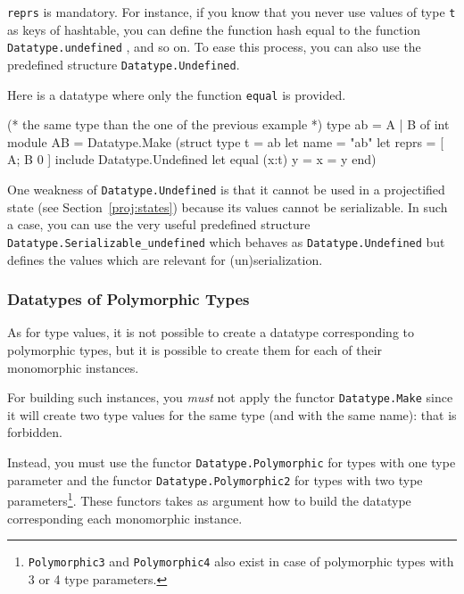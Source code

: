 \texttt{reprs} is mandatory. For instance, if you know that you never
use values of type \texttt{t} as keys of hashtable, you can define the function
hash equal to the function
\texttt{Datatype.undefined} , and so on. To ease
this process, you can also use the predefined structure
\texttt{Datatype.Undefined}.
\begin{example}
  Here is a datatype where only the function \texttt{equal} is provided.
\begin{ocamlcode}
(* the same type than the one of the previous example *)
type ab = A | B of int
module AB =
  Datatype.Make
    (struct
       type t = ab
       let name = "ab"
       let reprs = [ A; B 0 ]
       include Datatype.Undefined
       let equal (x:t) y = x = y
    end)
\end{ocamlcode}
\end{example}

One weakness of \texttt{Datatype.Undefined} is that it cannot be used in a
projectified state (see Section~\ref{proj:states}) because its values cannot be
serializable. In such a case, you can use the very useful predefined structure
\texttt{Datatype.Serializable\_undefined}%
 which behaves as
\texttt{Datatype.Undefined} but defines the values which are relevant for
(un)serialization.

\subsubsection{Datatypes of Polymorphic Types}

As for type values, it is not possible to create a datatype corresponding to
polymorphic types, but it is possible to create them for each of their
monomorphic instances.

\begin{important}
For building such instances, you \emph{must} not apply the functor
\texttt{Datatype.Make} since it will create two type
values for the same type (and with the same name): that is forbidden.
\end{important}

Instead, you must use the functor
\texttt{Datatype.Polymorphic} for types with one
type parameter and the functor
\texttt{Datatype.Polymorphic2} for types with
two type parameters\footnote{%
\texttt{Polymorphic3} and
\texttt{Polymorphic4}
also exist in case of polymorphic types with 3 or 4 type parameters.}.
These functors takes as argument how to build the datatype
corresponding each monomorphic instance.

